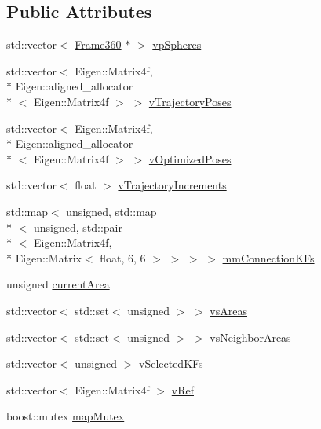 \subsection*{Public Attributes}
\begin{DoxyCompactItemize}
\item 
std\-::vector$<$ \hyperlink{classFrame360}{Frame360} $\ast$ $>$ \hyperlink{structMap360_ad226d3c149be805f4455722325499a0f}{vp\-Spheres}
\item 
std\-::vector$<$ Eigen\-::\-Matrix4f, \\*
Eigen\-::aligned\-\_\-allocator\\*
$<$ Eigen\-::\-Matrix4f $>$ $>$ \hyperlink{structMap360_a6a2b5cd71a12419ce5367208bca515ce}{v\-Trajectory\-Poses}
\item 
std\-::vector$<$ Eigen\-::\-Matrix4f, \\*
Eigen\-::aligned\-\_\-allocator\\*
$<$ Eigen\-::\-Matrix4f $>$ $>$ \hyperlink{structMap360_aee86cfa9b18e8f40f2a351b16d4acd4b}{v\-Optimized\-Poses}
\item 
std\-::vector$<$ float $>$ \hyperlink{structMap360_a8e2c7d8e67a89301b1b0b36a5380671f}{v\-Trajectory\-Increments}
\item 
std\-::map$<$ unsigned, std\-::map\\*
$<$ unsigned, std\-::pair\\*
$<$ Eigen\-::\-Matrix4f, \\*
Eigen\-::\-Matrix$<$ float, 6, 6 $>$ $>$ $>$ $>$ \hyperlink{structMap360_ad7aed73485cab8d7b6b91a053831fb99}{mm\-Connection\-K\-Fs}
\item 
unsigned \hyperlink{structMap360_a6089d8dc88895558887769db3300a132}{current\-Area}
\item 
std\-::vector$<$ std\-::set$<$ unsigned $>$ $>$ \hyperlink{structMap360_af1986f493d43729c167c094c3a9e4246}{vs\-Areas}
\item 
std\-::vector$<$ std\-::set$<$ unsigned $>$ $>$ \hyperlink{structMap360_a3065898bde0f1cfe47bb5f3012c81d2b}{vs\-Neighbor\-Areas}
\item 
std\-::vector$<$ unsigned $>$ \hyperlink{structMap360_a3514228ffebb5d5f07dc82d5eb4f59d3}{v\-Selected\-K\-Fs}
\item 
std\-::vector$<$ Eigen\-::\-Matrix4f $>$ \hyperlink{structMap360_a1525552984f02f8438b654473c3ebf95}{v\-Ref}
\item 
boost\-::mutex \hyperlink{structMap360_a46200d015411f7421778c096d236dd7c}{map\-Mutex}
\end{DoxyCompactItemize}


